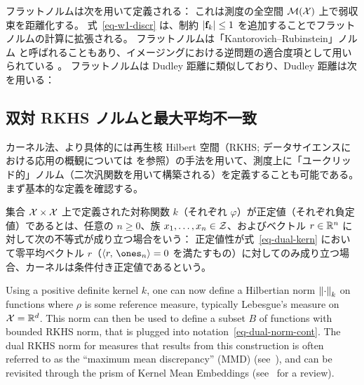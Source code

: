 \begin{example}
フラットノルムは次を用いて定義される：
これは測度の全空間 $\mathcal{M}(\mathcal{X})$ 上で弱収束を距離化する。
%
式~\eqref{eq-w1-discr} は、制約 $\left\lvert\mathrm{\textbf{f}}_k\right\rvert \leq 1$ を追加することでフラットノルムの計算に拡張される。
%
フラットノルムは「Kantorovich--Rubinstein」ノルム \citep{hanin1992kantorovich} と呼ばれることもあり、イメージングにおける逆問題の適合度項として用いられている \citep{lellmann2014imaging}。
%
フラットノルムは Dudley 距離に類似しており、Dudley 距離は次を用いる：
\end{example}


\subsection{双対 RKHS ノルムと最大平均不一致}
\label{sec-mmd}


カーネル法、より具体的には再生核 Hilbert 空間（RKHS; データサイエンスにおける応用の概観については \citep{scholkopf2002learning} を参照）の手法を用いて、測度上に「ユークリッド的」ノルム（二次汎関数を用いて構築される）を定義することも可能である。まず基本的な定義を確認する。

\begin{defn}\label{def-negativedefinitekernel}
集合 $\mathcal{X} \times \mathcal{X}$ 上で定義された対称関数 $k$（それぞれ $\varphi$）が正定値（それぞれ負定値）であるとは、任意の $n\geq0$、族 $x_1,\dots,x_n\in\mathcal{Z}$、およびベクトル $r\in\mathbb{R}^n$ に対して次の不等式が成り立つ場合をいう：
正定値性が式~\eqref{eq-dual-kern} において零平均ベクトル $r$（\ie $\dotp{r}{\ones_n}=0$ を満たすもの）に対してのみ成り立つ場合、カーネルは条件付き正定値であるという。
\end{defn}


Using a positive definite kernel $k$, one can now define a Hilbertian norm $\left\| \cdot \right\|_k$ on functions
where $\rho$ is some reference measure, typically Lebesgue's measure on $\mathcal{X}=\mathbb{R}^d$. This norm can then be used to define a subset $B$ of functions with bounded RKHS norm,
%
that is plugged into notation~\eqref{eq-dual-norm-cont}. The dual RKHS norm for measures that results from this construction is often referred to as the ``maximum mean discrepancy'' (MMD) (see~\citet{gretton2007kernel}), and can be revisited through the prism of Kernel Mean Embeddings (see~\citet{muandet2017kernel} for a review).
\fi


